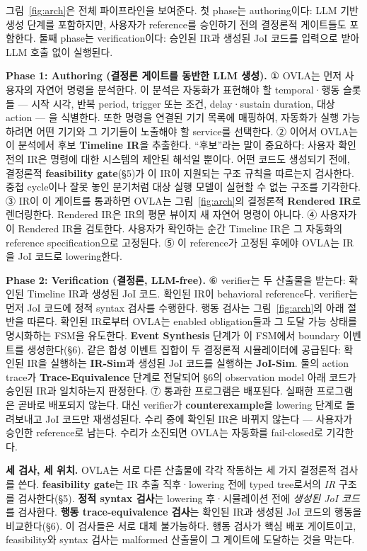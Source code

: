 \documentclass[sigconf,nonacm,anonymous,review]{acmart}
\begin{document}
그림~\ref{fig:arch}은 전체 파이프라인을 보여준다. 첫 phase는 authoring이다: LLM 기반 생성 단계를 포함하지만, 사용자가 reference를 승인하기 전의 결정론적 게이트들도 포함한다. 둘째 phase는 verification이다: 승인된 IR과 생성된 JoI 코드를 입력으로 받아 LLM 호출 없이 실행된다.

\textbf{Phase 1: Authoring (결정론 게이트를 동반한 LLM 생성).} ① OVLA는 먼저 사용자의 자연어 명령을 분석한다. 이 분석은 자동화가 표현해야 할 temporal·행동 슬롯들 — 시작 시각, 반복 period, trigger 또는 조건, delay·sustain duration, 대상 action — 을 식별한다. 또한 명령을 연결된 기기 목록에 매핑하여, 자동화가 실행 가능하려면 어떤 기기와 그 기기들이 노출해야 할 service를 선택한다. ② 이어서 OVLA는 이 분석에서 후보 \textbf{Timeline IR}을 추출한다. ``후보''라는 말이 중요하다: 사용자 확인 전의 IR은 명령에 대한 시스템의 제안된 해석일 뿐이다. 어떤 코드도 생성되기 전에, 결정론적 \textbf{feasibility gate}(\S5)가 이 IR이 지원되는 구조 규칙을 따르는지 검사한다. 중첩 cycle이나 잘못 놓인 분기처럼 대상 실행 모델이 실현할 수 없는 구조를 기각한다. ③ IR이 이 게이트를 통과하면 OVLA는 그림~\ref{fig:arch}의 결정론적 \textbf{Rendered IR}로 렌더링한다. Rendered IR은 IR의 평문 뷰이지 새 자연어 명령이 아니다. ④ 사용자가 이 Rendered IR을 검토한다. 사용자가 확인하는 순간 Timeline IR은 그 자동화의 reference specification으로 고정된다. ⑤ 이 reference가 고정된 후에야 OVLA는 IR을 JoI 코드로 lowering한다.

\textbf{Phase 2: Verification (결정론, LLM-free).} ⑥ verifier는 두 산출물을 받는다: 확인된 Timeline IR과 생성된 JoI 코드. 확인된 IR이 behavioral reference다. verifier는 먼저 JoI 코드에 정적 syntax 검사를 수행한다. 행동 검사는 그림~\ref{fig:arch}의 아래 절반을 따른다. 확인된 IR로부터 OVLA는 enabled obligation들과 그 도달 가능 상태를 명시화하는 FSM을 유도한다. \textbf{Event Synthesis} 단계가 이 FSM에서 boundary 이벤트를 생성한다(\S6). 같은 합성 이벤트 집합이 두 결정론적 시뮬레이터에 공급된다: 확인된 IR을 실행하는 \textbf{IR-Sim}과 생성된 JoI 코드를 실행하는 \textbf{JoI-Sim}. 둘의 action trace가 \textbf{Trace-Equivalence} 단계로 전달되어 \S6의 observation model 아래 코드가 승인된 IR과 일치하는지 판정한다. ⑦ 통과한 프로그램은 배포된다. 실패한 프로그램은 곧바로 배포되지 않는다. 대신 verifier가 \textbf{counterexample}을 lowering 단계로 돌려보내고 JoI 코드만 재생성된다. 수리 중에 확인된 IR은 바뀌지 않는다 — 사용자가 승인한 reference로 남는다. 수리가 소진되면 OVLA는 자동화를 fail-closed로 기각한다.

\textbf{세 검사, 세 위치.} OVLA는 서로 다른 산출물에 각각 작동하는 세 가지 결정론적 검사를 쓴다. \textbf{feasibility gate}는 IR 추출 직후·lowering 전에 typed tree로서의 \emph{IR} 구조를 검사한다(\S5). \textbf{정적 syntax 검사}는 lowering 후·시뮬레이션 전에 \emph{생성된 JoI 코드}를 검사한다. \textbf{행동 trace-equivalence 검사}는 확인된 IR과 생성된 JoI 코드의 행동을 비교한다(\S6). 이 검사들은 서로 대체 불가능하다. 행동 검사가 핵심 배포 게이트이고, feasibility와 syntax 검사는 malformed 산출물이 그 게이트에 도달하는 것을 막는다.
\end{document}
